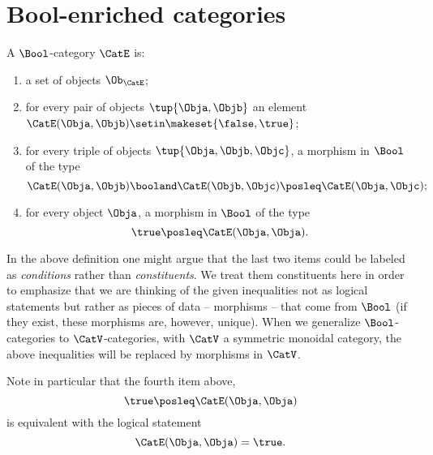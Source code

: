 
\section{Bool-enriched categories}
\label{sec:bool-enrichment}

\begin{ctdefinition}
    \label{def:bool-category}
    A $\Bool$-category $\CatE$ is:

    \constit
    \begin{enumerate}
        \item a set of objects $\Ob_\CatE$;
        \item for every pair of objects $\tup{\Obja, \Objb}$ an element $\CatE(\Obja, \Objb) \setin\makeset{\false, \true}$;
        \item for every triple of objects $\tup{\Obja, \Objb, \Objc}$, a morphism in $\Bool$ of the type
              \begin{equation}
                  \CatE(\Obja, \Objb) \booland \CatE(\Objb, \Objc) \posleq \CatE(\Obja, \Objc);
              \end{equation}
        \item for every object $\Obja$, a morphism in $\Bool$ of the type
              \begin{equation}
                  \true \posleq \CatE(\Obja, \Obja).
              \end{equation}
    \end{enumerate}
\end{ctdefinition}

In the above definition one might argue that the last two items could be labeled as \emph{conditions} rather than \emph{constituents}.
We treat them constituents here in order to emphasize that we are thinking of the given inequalities not as logical statements but rather as pieces of data -- morphisms -- that come from $\Bool$ (if they exist, these morphisms are, however, unique).
When we generalize $\Bool$-categories to $\CatV$-categories, with $\CatV$ a symmetric monoidal category, the above inequalities will be replaced by morphisms in $\CatV$.

Note in particular that the fourth item above,
\begin{equation}
    \true \posleq \CatE(\Obja, \Obja)
\end{equation}
is equivalent with the logical statement
\begin{equation}
    \CatE(\Obja, \Obja) = \true.
\end{equation}

